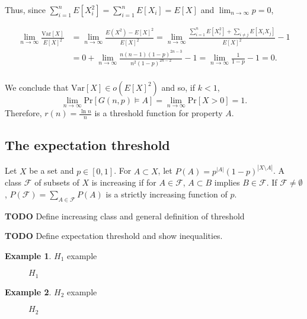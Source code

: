 \documentclass[12pt]{article}
\theoremstyle{definition}
\newtheorem{exmp}{Example}[section]
\theoremstyle{remark}
\def\Pr{\ensuremath{\mbox{Pr}}}
\begin{document}
Thus, since $\sum_{i = 1}^{n}E[X_i^2] =  \sum_{i = 1}^n E[X_i] = E[X]$ and $\lim_{n \to \infty} p = 0$,

\begin{align*}
    \lim_{n \to \infty} \frac{\text{Var}[X]}{E[X]^2} &= 
    \lim_{n \to \infty}\frac{E(X^2) - E[X]^2}{E[X]^2} = \lim_{n \to \infty} \frac{\sum_{i = 1}^n E[X_i^2] + \sum_{i \neq j}E[X_iX_j]}{E[X]^2} - 1 \\ &= 0 + \lim_{n \to \infty} \frac{ n(n - 1)(1 - p)^{2n - 3}}{n^2(1 - p)^{2n - 2}} - 1= \lim_{n \to \infty} \frac{1}{1 - p} - 1 = 0.\\
\end{align*} \par
We conclude that $\text{Var}[X] \in o(E[X]^2)$ and so, if $k < 1$, \[\lim_{n \to \infty} \Pr[G(n, p) \vDash A] = \lim_{n \to \infty} \Pr[X > 0] = 1.\] Therefore, $r(n) = \frac{\ln n}{n}$ is a threshold function for property $A$.

\subsection{The expectation threshold}

Let $X$ be a set and $p \in [0, 1]$. For $A \subset X$, let $P(A) = p^{|A|}(1 - p)^{|X \setminus A|}$. A class $\mathcal{F}$ of subsets of $X$ is increasing if for $A \in \mathcal{F}$, $A \subset B$ implies $B \in \mathcal{F}$. If $\mathcal{F} \neq \emptyset$,  $P(\mathcal{F}) = \sum_{A \in \mathcal{F}} P(A)$ is a strictly increasing function of $p$.
 
\textbf{TODO} Define increasing class and general definition of threshold \cite{park2022proof} 

\noindent \textbf{TODO} Define expectation threshold and show inequalities. \cite{frankston2021thresholds}

\begin{exmp}
    $H_1$ example
    \begin{figure}[h]
        \centering
        \caption{$H_1$}
        \label{H1}
    \end{figure}
\end{exmp}

\begin{exmp}
    $H_2$ example
    \begin{figure}[h]
        \centering
        \caption{$H_2$}
        \label{H2}
    \end{figure}
    
\end{exmp}
\end{document}

